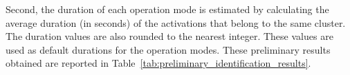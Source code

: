 Second, the duration of each operation mode is estimated by calculating the average duration (in seconds) of the activations that belong to the same cluster. The duration values are also rounded to the nearest integer. These values are used as default durations for the operation modes. These preliminary results obtained are reported in Table~\ref{tab:preliminary_identification_results}.

\begin{table}[hbt]
  \centering
\end{table}
